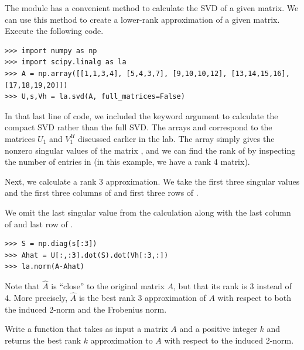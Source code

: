 The  module has a convenient method to calculate the SVD of a given matrix. We can use
this method to create a lower-rank approximation of a given matrix. Execute the following code.
\begin{lstlisting}
>>> import numpy as np
>>> import scipy.linalg as la
>>> A = np.array([[1,1,3,4], [5,4,3,7], [9,10,10,12], [13,14,15,16], [17,18,19,20]])
>>> U,s,Vh = la.svd(A, full_matrices=False)
\end{lstlisting}
In that last line of code, we included the keyword argument  to calculate the
compact SVD rather than the full SVD. The arrays  and  correspond to the matrices
$U_1$ and $V_1^H$ discussed earlier in the lab. The array  simply gives the nonzero singular values
of the matrix , and we can find the rank of  by inspecting the number of entries in  (in this
example, we have a rank 4 matrix). 

Next, we calculate a rank 3 approximation.
We take the first three singular values and the first three columns of  and first three rows of .

We omit the last singular value from the calculation along with the last column of  and last row of .

\begin{lstlisting}
>>> S = np.diag(s[:3])
>>> Ahat = U[:,:3].dot(S).dot(Vh[:3,:])
>>> la.norm(A-Ahat)
\end{lstlisting}
Note that $\widehat A$ is ``close'' to the original matrix $A$, but that its rank is 3 instead of 4. More
precisely, $\widehat A$ is the best rank 3 approximation of $A$ with respect to both the induced 2-norm and
the Frobenius norm. 

\begin{problem}
Write a function  that takes as input a matrix $A$ and a positive integer $k$ and returns 
the best rank $k$ approximation to $A$ with respect to the induced 2-norm.
\label{prob:svd_approx}
\end{problem}

